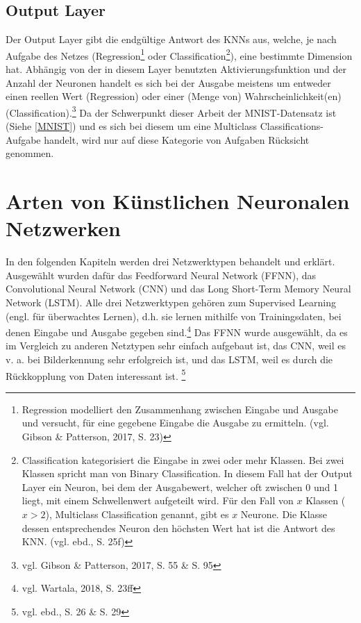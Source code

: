 \documentclass[
	a4paper,
	12pt,
	ngerman,
	oneside
]{scrreprt}											%
\begin{document}
			\subsection{Output Layer}\label{OutputLayer}
				Der Output Layer gibt die endgültige Antwort des KNNs aus, welche, je nach Aufgabe des Netzes (Regression\footnote{Regression modelliert den Zusammenhang zwischen Eingabe und Ausgabe und versucht, für eine gegebene Eingabe die Ausgabe zu ermitteln. (vgl. Gibson \& Patterson, 2017, S. 23)} oder Classification\footnote{Classification kategorisiert die Eingabe in zwei oder mehr Klassen. Bei zwei Klassen spricht man von Binary Classification. In diesem Fall hat der Output Layer ein Neuron, bei dem der Ausgabewert, welcher oft zwischen 0 und 1 liegt, mit einem Schwellenwert aufgeteilt wird. Für den Fall von $x$ Klassen ($x > 2$), Multiclass Classification genannt, gibt es $x$ Neurone. Die Klasse dessen entsprechendes Neuron den höchsten Wert hat ist die Antwort des KNN. (vgl. ebd., S. 25f)}), eine bestimmte Dimension hat. Abhängig von der in diesem Layer benutzten Aktivierungsfunktion und der Anzahl der Neuronen handelt es sich bei der Ausgabe meistens um entweder einen reellen Wert (Regression) oder einer (Menge von) Wahrscheinlichkeit(en) (Classification).\footnote{vgl. Gibson \& Patterson, 2017, S. 55 \& S. 95} Da der Schwerpunkt dieser Arbeit der MNIST-Datensatz ist (Siehe \ref{MNIST}) und es sich bei diesem um eine Multiclass Classifications-Aufgabe handelt, wird nur auf diese Kategorie von Aufgaben Rücksicht genommen. 
		
		
		\section{Arten von Künstlichen Neuronalen Netzwerken}\label{Arten}
			In den folgenden Kapiteln werden drei Netzwerktypen behandelt und erklärt. Ausgewählt wurden dafür das Feedforward Neural Network (FFNN), das Convolutional Neural Network (CNN) und das Long Short-Term Memory Neural Network (LSTM). Alle drei Netzwerktypen gehören zum Supervised Learning (engl. für überwachtes Lernen), d.h. sie lernen mithilfe von Trainingsdaten, bei denen Eingabe und Ausgabe gegeben sind.\footnote{vgl. Wartala, 2018, S. 23ff} Das FFNN wurde ausgewählt, da es im Vergleich zu anderen Netztypen sehr einfach aufgebaut ist, das CNN, weil es v. a. bei Bilderkennung sehr erfolgreich ist, und das LSTM, weil es durch die Rückkopplung von Daten interessant ist. \footnote{vgl. ebd., S. 26 \& S. 29}
			
\end{document}
